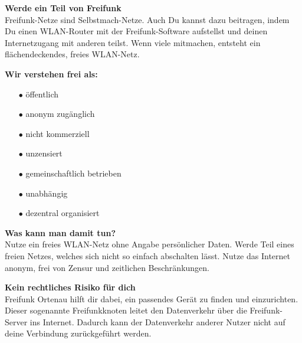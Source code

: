 \documentclass[a4paper]{article}
\begin{document}
\begin{Row}
    \begin{Cell}{5}
    \textbf{Werde ein Teil von Freifunk} \\
Freifunk-Netze sind Selbstmach-Netze. Auch Du kannst dazu beitragen, indem Du einen WLAN-Router mit der Freifunk-Software aufstellst und deinen Internetzugang mit anderen teilst. Wenn viele mitmachen, entsteht ein flächendeckendes, freies WLAN-Netz.
    \end{Cell}
    \begin{Cell}{4}
    \textbf{Wir verstehen frei als:} \vspace*{-0.18cm}
	\begin{itemize}
	   \item[\textcolor{freifunkpink}{\Large$\bullet$}] öffentlich \vspace*{-0.3cm}
	   \item[\textcolor{freifunkpink}{\Large$\bullet$}] anonym zugänglich \vspace*{-0.3cm}
	   \item[\textcolor{freifunkpink}{\Large$\bullet$}] nicht kommerziell \vspace*{-0.3cm}
	   \item[\textcolor{freifunkpink}{\Large$\bullet$}] unzensiert \vspace*{-0.3cm}
	   \item[\textcolor{freifunkpink}{\Large$\bullet$}] gemeinschaftlich betrieben\vspace*{-0.3cm}
	   \item[\textcolor{freifunkpink}{\Large$\bullet$}] unabhängig\vspace*{-0.3cm}
	   \item[\textcolor{freifunkpink}{\Large$\bullet$}] dezentral organisiert
	\end{itemize}
    \end{Cell}
\end{Row}
\newpage

\thispagestyle{empty}

\begin{Row}[cellsep=0.75cm]
    \begin{Cell}{4}
    \textbf{Was kann man damit tun?} \\
Nutze ein freies WLAN-Netz ohne Angabe persönlicher Daten. Werde Teil eines freien Netzes, welches sich nicht so einfach abschalten lässt.  Nutze das Internet anonym, frei von Zensur und zeitlichen Beschränkungen.
    \end{Cell}
\begin{Cell}{5}
    \textbf{Kein rechtliches Risiko für dich} \\
Freifunk Ortenau hilft dir dabei, ein passendes Gerät zu finden und einzurichten. Dieser sogenannte Freifunkknoten leitet den Datenverkehr über die Freifunk-Server ins Internet. Dadurch kann der Datenverkehr anderer Nutzer nicht auf deine Verbindung zurückgeführt werden.
\end{Cell}
\end{Row}
\end{document}
